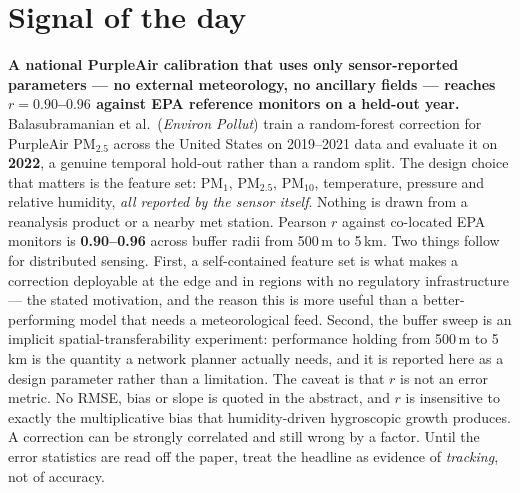 \documentclass[10pt]{article}
\begin{document}
\vspace{6mm}

\section*{\sffamily\bfseries\color{Deep}Signal of the day}
\vspace{-1.5mm}{\color{Amber}\rule{\linewidth}{1.1pt}}\vspace{2.5mm}

\begin{keybox}
{\sffamily\bfseries\small\color{Deep}A national PurpleAir calibration that uses only
sensor-reported parameters --- no external meteorology, no ancillary fields --- reaches
$r=0.90$--$0.96$ against EPA reference monitors on a held-out year.}\\[1.4mm]
\footnotesize
Balasubramanian et al.\ (\textit{Environ Pollut}) train a random-forest correction for
PurpleAir PM$_{2.5}$ across the United States on 2019--2021 data and evaluate it on
\textbf{2022}, a genuine temporal hold-out rather than a random split. The design choice
that matters is the feature set: PM$_1$, PM$_{2.5}$, PM$_{10}$, temperature, pressure and
relative humidity, \emph{all reported by the sensor itself}. Nothing is drawn from a
reanalysis product or a nearby met station. Pearson $r$ against co-located EPA monitors is
\textbf{0.90--0.96} across buffer radii from 500\,m to 5\,km. Two things follow for
distributed sensing. First, a self-contained feature set is what makes a correction
deployable at the edge and in regions with no regulatory infrastructure --- the stated
motivation, and the reason this is more useful than a better-performing model that needs
a meteorological feed. Second, the buffer sweep is an implicit spatial-transferability
experiment: performance holding from 500\,m to 5\,km is the quantity a network planner
actually needs, and it is reported here as a design parameter rather than a limitation.
The caveat is that $r$ is not an error metric. No RMSE, bias or slope is quoted in the
abstract, and $r$ is insensitive to exactly the multiplicative bias that humidity-driven
hygroscopic growth produces. A correction can be strongly correlated and still wrong by a
factor. Until the error statistics are read off the paper, treat the headline as evidence
of \emph{tracking}, not of accuracy.
\end{keybox}

\vspace{3mm}
\end{document}
